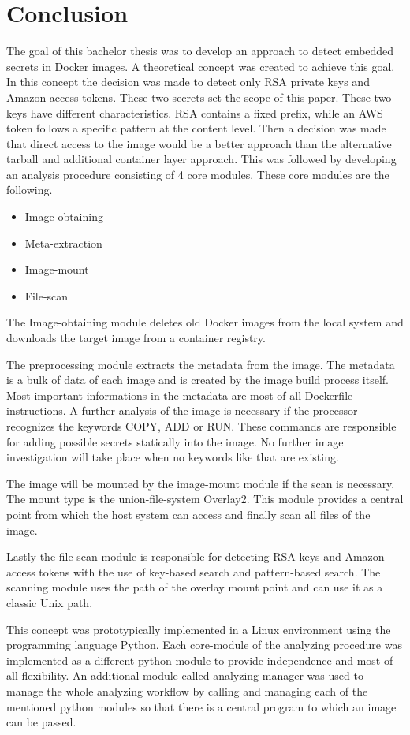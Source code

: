 \chapter{Conclusion}
\label{ch:end:conclusion}
The goal of this bachelor thesis was to develop an approach to detect embedded secrets in Docker images. 
A theoretical concept was created to achieve this goal. 
In this concept the decision was made to detect only RSA private keys and Amazon access tokens.
These two secrets set the scope of this paper. These two keys have different characteristics.
RSA contains a fixed prefix, while an AWS token follows a specific pattern at the content level.
Then a decision was made that direct access to the image would be a better approach than the alternative tarball and additional container layer approach.
This was followed by developing an analysis procedure consisting of 4 core modules.
These core modules are the following.
\begin{itemize}
\item Image-obtaining
\item Meta-extraction
\item Image-mount
\item File-scan
\end{itemize}
The Image-obtaining module deletes old Docker images from the local system and downloads the target image from a container registry.

The preprocessing module extracts the metadata from the image. 
The metadata is a bulk of data of each image and is created by the image build process itself.
Most important informations in the metadata are most of all Dockerfile instructions.
A further analysis of the image is necessary if the processor recognizes the keywords COPY, ADD or RUN.
These commands are responsible for adding possible secrets statically into the image. 
No further image investigation will take place when no keywords like that are existing. 

The image will be mounted by the image-mount module if the scan is necessary. The mount type is the union-file-system Overlay2.
This module provides a central point from which the host system can access and finally scan all files of the image.

Lastly the file-scan module is responsible for detecting RSA keys and Amazon access tokens with the use of key-based search and pattern-based search.
The scanning module uses the path of the overlay mount point and can use it as a classic Unix path.

This concept was prototypically implemented in a Linux environment using the programming language Python.
Each core-module of the analyzing procedure was implemented as a different python module to provide independence and most of all flexibility. 
An additional module called analyzing manager was used to manage the whole analyzing workflow by calling and managing each of the mentioned python modules so that there is a central program to which an image can be passed.

